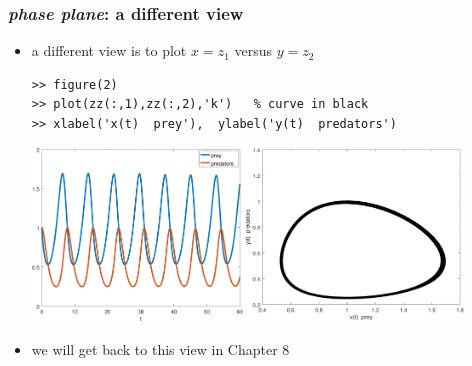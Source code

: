 \documentclass[dvipsnames,colorlinks]{beamer}
\begin{document}
\begin{frame}[fragile]
\frametitle{\emph{phase plane}: a different view}

\begin{itemize}
\item a different view is to plot $x=z_1$ versus $y=z_2$

\begin{Verbatim}[fontsize=\small]
>> figure(2)
>> plot(zz(:,1),zz(:,2),'k')   % curve in black
>> xlabel('x(t)  prey'),  ylabel('y(t)  predators')
\end{Verbatim}

\bigskip
\mbox{\includegraphics[width=0.44\textwidth]{figs/lotka-time}\quad \includegraphics[width=0.46\textwidth]{figs/lotka-phase}}
\item we will get back to this view in Chapter 8
\end{itemize}
\end{frame}
\end{document}
